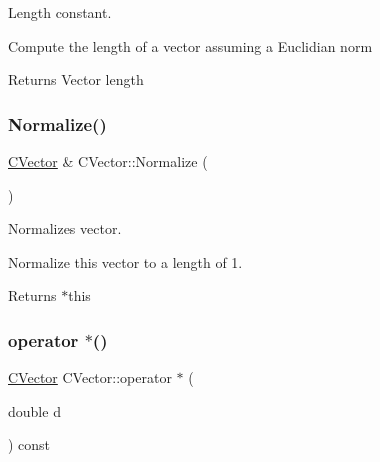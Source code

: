 Length constant. 

Compute the length of a vector assuming a Euclidian norm


\begin{DoxyCode}{0}
\end{DoxyCode}
 \begin{DoxyReturn}{Returns}
Vector length 
\end{DoxyReturn}
\mbox{\label{class_c_vector_a843889621cc1fec46c763ed323f14628}} 
\subsubsection{\texorpdfstring{Normalize()}{Normalize()}}
{\footnotesize\ttfamily \mbox{\hyperlink{class_c_vector}{C\+Vector}} \& C\+Vector\+::\+Normalize (\begin{DoxyParamCaption}{ }\end{DoxyParamCaption})}



Normalizes vector. 

Normalize this vector to a length of 1.


\begin{DoxyCode}{0}
\end{DoxyCode}
 \begin{DoxyReturn}{Returns}
$\ast$this 
\end{DoxyReturn}
\mbox{\label{class_c_vector_aaf9d43b1bf62c92b22397b3a1c04bb80}} 
\subsubsection{\texorpdfstring{operator $\ast$()}{operator *()}}
{\footnotesize\ttfamily \mbox{\hyperlink{class_c_vector}{C\+Vector}} C\+Vector\+::operator $\ast$ (\begin{DoxyParamCaption}\item[{double}]{d }\end{DoxyParamCaption}) const}

